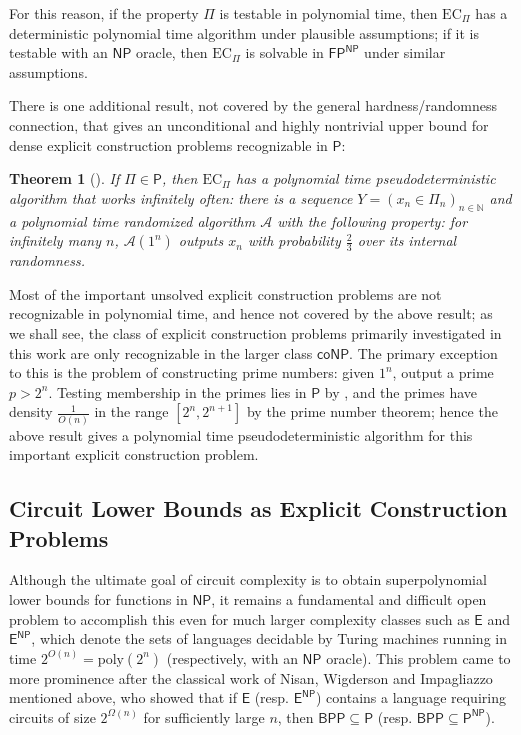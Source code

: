 \documentclass[11pt]{article}
\newtheorem{theorem}{Theorem}
\newcommand{\todo}[1]{\textcolor{red}{TODO: #1}}
\newcommand{\poly}{\mathrm{poly}}
\newcommand{\ec}{\mathrm{EC}_\Pi}
\begin{document}
For this reason, if the property $\Pi$ is testable in polynomial time, then $\ec$ has a deterministic polynomial time algorithm under plausible assumptions; if it is testable with an $\mathsf{NP}$ oracle, then $\ec$ is solvable in $\mathsf{FP^{NP}}$ under similar assumptions.

There is one additional result, not covered by the general hardness/randomness connection, that gives an unconditional and highly nontrivial upper bound for dense explicit construction problems recognizable in $\mathsf{P}$:

\begin{theorem}[\cite{pseudo-primes}]\label{thm:pseudo-prime}
If $\Pi \in \mathsf{P}$, then $\ec$ has a polynomial time pseudodeterministic algorithm that works infinitely often: there is a sequence $Y = (x_n \in \Pi_n)_{n \in \mathbb{N}}$ and a polynomial time randomized algorithm $\mathcal{A}$ with the following property: for infinitely many $n$, $\mathcal{A}(1^n)$ outputs $x_n$ with probability $\frac{2}{3}$ over its internal randomness.
\end{theorem}

Most of the important unsolved explicit construction problems are not recognizable in polynomial time, and hence not covered by the above result; as we shall see, the class of explicit construction problems primarily investigated in this work are only recognizable in the larger class $\mathsf{coNP}$. The primary exception to this is the problem of constructing prime numbers: given $1^n$, output a prime $p > 2^n$. Testing membership in the primes lies in $\mathsf{P}$ by \cite{primes}, and the primes have density $\frac{1}{O(n)}$ in the range $[2^n,2^{n+1}]$ by the prime number theorem; hence the above result gives a polynomial time pseudodeterministic algorithm for this important explicit construction problem.


\subsection{Circuit Lower Bounds as Explicit Construction Problems}\label{sec:circuit-lb}
Although the ultimate goal of circuit complexity is to obtain superpolynomial lower bounds for functions in $\mathsf{NP}$, it remains a fundamental and difficult open problem to accomplish this even for much larger complexity classes such as $\mathsf{E}$ and $\mathsf{E^{NP}}$, which denote the sets of languages decidable by Turing machines running in time $2^{O(n)} = \poly(2^n)$ (respectively, with an $\mathsf{NP}$ oracle). This problem came to more prominence after the classical work of Nisan, Wigderson and Impagliazzo mentioned above, who showed that if $\mathsf{E}$ (resp. $\mathsf{E^{NP}}$) contains a language requiring circuits of size $2^{\Omega(n)}$ for sufficiently large $n$, then $\mathsf{BPP} \subseteq \mathsf{P}$ (resp. $\mathsf{BPP} \subseteq \mathsf{P^{NP}}$).
\end{document}
